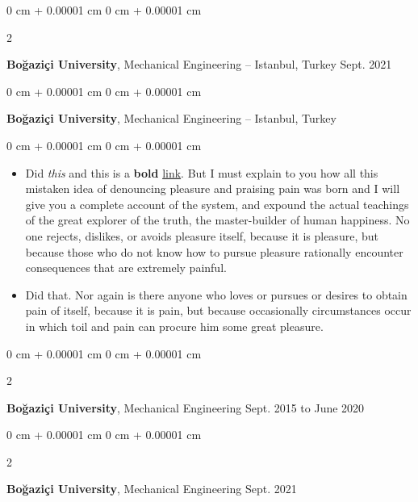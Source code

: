 \documentclass[10pt, letterpaper]{article}
\newenvironment{highlights}{
    \begin{itemize}[
        topsep=0.10 cm,
        parsep=0.10 cm,
        partopsep=0pt,
        itemsep=0pt,
        leftmargin=0 cm + 10pt
    ]
}{
    \end{itemize}
} %
\newenvironment{onecolentry}{
    \begin{adjustwidth}{
        0 cm + 0.00001 cm
    }{
        0 cm + 0.00001 cm
    }
}{
    \end{adjustwidth}
} %
\newenvironment{twocolentry}[2][]{
    \onecolentry
    \def\secondColumn{#2}
    \setcolumnwidth{\fill, 4.5 cm}
    \begin{paracol}{2}
}{
    \switchcolumn \raggedleft \secondColumn
    \end{paracol}
    \endonecolentry
} %
\begin{document}
        \vspace{0.2 cm}

        \begin{twocolentry}{
            Sept. 2021
        }
            \textbf{Boğaziçi University}, Mechanical Engineering -- Istanbul, Turkey\end{twocolentry}



        \vspace{0.2 cm}

        \begin{onecolentry}
            \textbf{Boğaziçi University}, Mechanical Engineering -- Istanbul, Turkey\end{onecolentry}

        \vspace{0.10 cm}
        \begin{onecolentry}
            \begin{highlights}
                \item Did \textit{this} and this is a \textbf{bold} \href{https://example.com}{link}. But I must explain to you how all this mistaken idea of denouncing pleasure and praising pain was born and I will give you a complete account of the system, and expound the actual teachings of the great explorer of the truth, the master-builder of human happiness. No one rejects, dislikes, or avoids pleasure itself, because it is pleasure, but because those who do not know how to pursue pleasure rationally encounter consequences that are extremely painful.
                \item Did that. Nor again is there anyone who loves or pursues or desires to obtain pain of itself, because it is pain, but because occasionally circumstances occur in which toil and pain can procure him some great pleasure.
            \end{highlights}
        \end{onecolentry}


        \vspace{0.2 cm}

        \begin{twocolentry}{
            Sept. 2015 to June 2020
        }
            \textbf{Boğaziçi University}, Mechanical Engineering\end{twocolentry}



        \vspace{0.2 cm}

        \begin{twocolentry}{
            Sept. 2021
        }
            \textbf{Boğaziçi University}, Mechanical Engineering\end{twocolentry}
\end{document}
